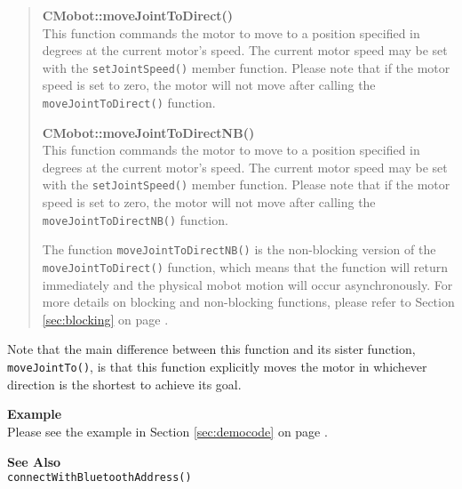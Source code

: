 \begin{quote}
{\bf CMobot::moveJointToDirect()}\\
This function commands the motor to move to a position specified in degrees at
the current motor's speed. The current motor speed may be set with the
\texttt{setJointSpeed()} member function. Please note that if the motor speed
is set to zero, the motor will not move after calling the
\texttt{moveJointToDirect()} function. 

{\bf CMobot::moveJointToDirectNB()}\\
This function commands the motor to move to a position specified in degrees at
the current motor's speed. The current motor speed may be set with the
\texttt{setJointSpeed()} member function. Please note that if the motor speed
is set to zero, the motor will not move after calling the
\texttt{moveJointToDirectNB()} function. 

The function \texttt{moveJointToDirectNB()} is the non-blocking version of
the \texttt{moveJointToDirect()} function, which means that the function will return
immediately and the physical mobot motion will occur asynchronously. For
more details on blocking and non-blocking functions, please refer to 
Section \ref{sec:blocking} on page \pageref{sec:blocking}.\\
\end{quote}

Note that the main difference between this function and its sister function,
\texttt{moveJointTo()}, is that this function explicitly moves the motor in
whichever direction is the shortest to achieve its goal.

\noindent
{\bf Example}\\
Please see the example in Section \ref{sec:democode} on page \pageref{sec:democode}.\\
\noindent

\noindent
{\bf See Also}\\
\texttt{connectWithBluetoothAddress()}

